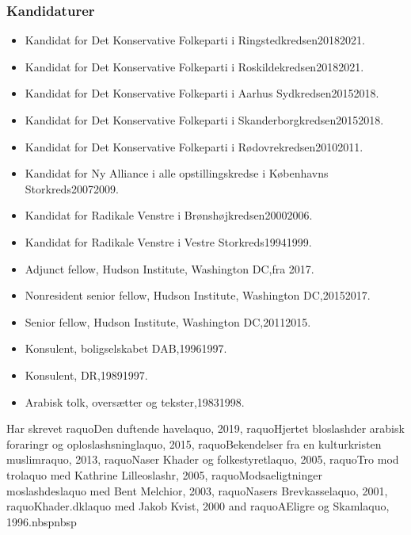 \documentclass[11pt, a4paper]{awesome-cv}
\begin{document}
\begin{cvletter}
\subsubsection*{Kandidaturer}
\begin{itemize}
\item Kandidat for Det Konservative Folkeparti i Ringstedkredsen20182021.
\item Kandidat for Det Konservative Folkeparti i Roskildekredsen20182021.
\item Kandidat for Det Konservative Folkeparti i Aarhus Sydkredsen20152018.
\item Kandidat for Det Konservative Folkeparti i Skanderborgkredsen20152018.
\item Kandidat for Det Konservative Folkeparti i Rødovrekredsen20102011.
\item Kandidat for Ny Alliance i alle opstillingskredse i Københavns Storkreds20072009.
\item Kandidat for Radikale Venstre i Brønshøjkredsen20002006.
\item Kandidat for Radikale Venstre i Vestre Storkreds19941999.
\end{itemize}
\begin{itemize}
\item Adjunct fellow, Hudson Institute, Washington DC,fra 2017.
\item Nonresident senior fellow, Hudson Institute, Washington DC,20152017.
\item Senior fellow, Hudson Institute, Washington DC,20112015.
\item Konsulent, boligselskabet DAB,19961997.
\item Konsulent, DR,19891997.
\item Arabisk tolk, oversætter og tekster,19831998.
\end{itemize}
Har skrevet raquoDen duftende havelaquo, 2019, raquoHjertet bloslashder  arabisk foraringr og oploslashsninglaquo, 2015, raquoBekendelser fra en kulturkristen muslimraquo, 2013, raquoNaser Khader og folkestyretlaquo, 2005, raquoTro mod trolaquo med Kathrine Lilleoslashr, 2005, raquoModsaeligtninger moslashdeslaquo med Bent Melchior, 2003, raquoNasers Brevkasselaquo, 2001, raquoKhader.dklaquo med Jakob Kvist, 2000 and raquoAEligre og Skamlaquo, 1996.nbspnbsp

\end{cvletter}
\end{document}
